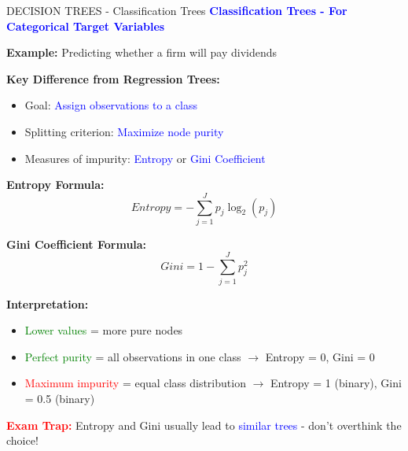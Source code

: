 \documentclass[8pt]{beamer}
\begin{document}
	\begin{frame}{DECISION TREES - Classification Trees}
		\fontsize{6.5}{7.5}\selectfont
		\textcolor{blue}{\textbf{Classification Trees - For Categorical Target Variables}}
		
		\textbf{Example:} Predicting whether a firm will pay dividends
		
		\textbf{Key Difference from Regression Trees:}
		\begin{itemize}
			\item Goal: \textcolor{blue}{Assign observations to a class}
			\item Splitting criterion: \textcolor{blue}{Maximize node purity}
			\item Measures of impurity: \textcolor{blue}{Entropy} or \textcolor{blue}{Gini Coefficient}
		\end{itemize}
		
		\textbf{Entropy Formula:}
		\[
		Entropy = -\sum_{j=1}^J p_j \log_2(p_j)
		\]
		
		\textbf{Gini Coefficient Formula:}
		\[
		Gini = 1 - \sum_{j=1}^J p_j^2
		\]
		
		\textbf{Interpretation:}
		\begin{itemize}
			\item \textcolor{green}{Lower values} = more pure nodes
			\item \textcolor{green}{Perfect purity} = all observations in one class $\rightarrow$ Entropy = 0, Gini = 0
			\item \textcolor{red}{Maximum impurity} = equal class distribution $\rightarrow$ Entropy = 1 (binary), Gini = 0.5 (binary)
		\end{itemize}
		
		\textcolor{red}{\textbf{Exam Trap:}} Entropy and Gini usually lead to \textcolor{blue}{similar trees} - don't overthink the choice!
	\end{frame}
	
\end{document}
